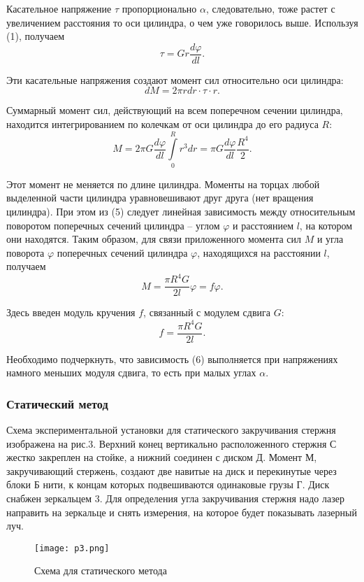 Касательное напряжение $\tau$ пропорционально $\alpha$,
следовательно, тоже растет с увеличением расстояния то оси
цилиндра, о чем уже говорилось выше. Используя (1),
получаем
\begin{equation}
    \tau = Gr\frac{d\varphi}{dl}.
\end{equation}

Эти касательные напряжения создают момент сил относительно
оси цилиндра:
\begin{equation}
    dM = 2\pi rdr\cdot \tau \cdot r.
\end{equation}

Суммарный момент сил, действующий на всем поперечном сечении
цилиндра, находится интегрированием по колечкам от оси
цилиндра до его радиуса $R$:
\begin{equation}
    M = 2\pi G\frac{d\varphi}{dl}\int\limits_0^R r^3dr =
    \pi G\frac{d\varphi}{dl}\frac{R^4}{2}.
\end{equation}

Этот момент не меняется по длине цилиндра. Моменты на торцах
любой выделенной части цилиндра уравновешивают друг друга
(нет вращения цилиндра). При этом из (5) следует линейная
зависимость между относительным поворотом поперечных сечений
цилиндра --  углом $\varphi$ и расстоянием $l$, на котором
они находятся. Таким образом, для связи приложенного момента
сил $M$ и угла поворота $\varphi$ поперечных сечений цилиндра
$\varphi$, находящихся на расстоянии $l$, получаем
\begin{equation}
    M = \frac{\pi R^4G}{2l}\varphi = f\varphi.
\end{equation}

Здесь введен модуль кручения $f$, связанный с модулем
сдвига $G$:
\begin{equation}
    f = \frac{\pi R^4 G}{2l}.
\end{equation}

Необходимо подчеркнуть, что зависимость (6) выполняется при
напряжениях намного меньших модуля сдвига, то есть при малых
углах $\alpha$.
\subsubsection{Статический метод}
Схема экспериментальной установки для статического
закручивания стержня изображена на рис.3. Верхний конец
вертикально расположенного стержня С жестко закреплен на
стойке, а нижний соединен с диском Д. Момент $М$,
закручивающий стержень, создают две навитые на диск и
перекинутые через блоки Б нити, к концам которых
подвешиваются одинаковые грузы Г. Диск снабжен зеркальцем 3.
Для определения угла закручивания стержня надо лазер
направить на зеркальце и снять измерения, на которое будет
показывать лазерный луч.
\begin{figure}[H]
    \centering
\texttt{[image: p3.png]}
    \caption{Схема для статического метода}
    \label{fig:my_label}
\end{figure}
